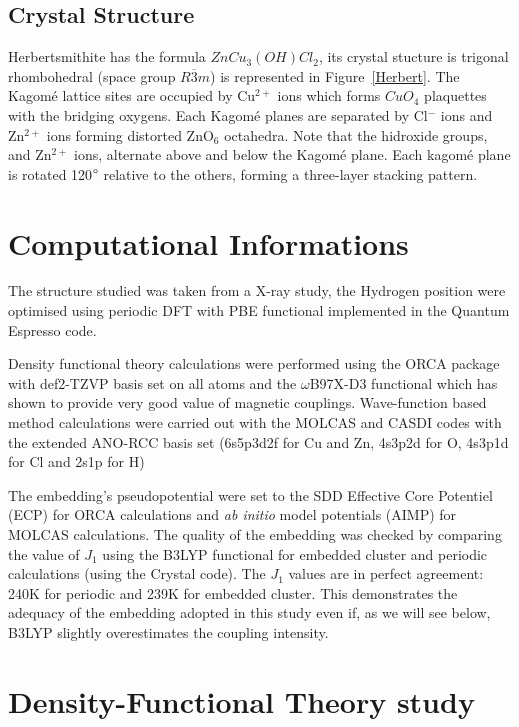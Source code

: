\documentclass[12pt]{report}
\numberwithin{equation}{section}
\begin{document}
\subsection*{Crystal Structure}

Herbertsmithite has the formula $ZnCu_3(OH)Cl_2$, its crystal stucture is trigonal rhombohedral (space group $R{\overline{3}m}$) is represented in Figure~\ref{Herbert}.
The Kagomé lattice sites are occupied by Cu$^{2+}$ ions which forms $CuO_4$ plaquettes with the bridging oxygens. 
Each Kagomé planes are separated by Cl$^-$ ions and Zn$^{2+}$ ions forming distorted ZnO$_6$ octahedra. 
Note that the hidroxide groups, and Zn$^{2+}$ ions, alternate above and below the Kagomé plane.
Each kagomé plane is rotated 120$\degree$ relative to the others, forming a three-layer stacking pattern.



\section{Computational Informations}

The structure studied was taken from a X-ray study\cite{braithwaite_herbertsmithite_2004}, the Hydrogen position were optimised using periodic DFT with PBE functional implemented in the Quantum Espresso code.

Density functional theory calculations were performed using the ORCA package with def2-TZVP basis set on all atoms and the $\omega$B97X-D3 functional which has shown to provide very good value of magnetic couplings.
Wave-function based method calculations were carried out with the MOLCAS and CASDI codes with the extended ANO-RCC basis set (6s5p3d2f for Cu and Zn, 4s3p2d
for O, 4s3p1d for Cl and 2s1p for H)

The embedding's pseudopotential were set to the SDD Effective Core Potentiel (ECP) for ORCA calculations and \textit{ab initio} model potentials (AIMP) for MOLCAS calculations. 
The quality of the embedding was checked by comparing the value of $J_1$ using the B3LYP functional for embedded cluster and periodic calculations (using the Crystal code). 
The $J_1$ values are in perfect agreement: 240K for periodic and 239K for embedded cluster. 
This demonstrates the adequacy of the embedding adopted in this study even if, as we will see below, B3LYP slightly overestimates the coupling intensity.

\section{Density-Functional Theory study}
\end{document}
